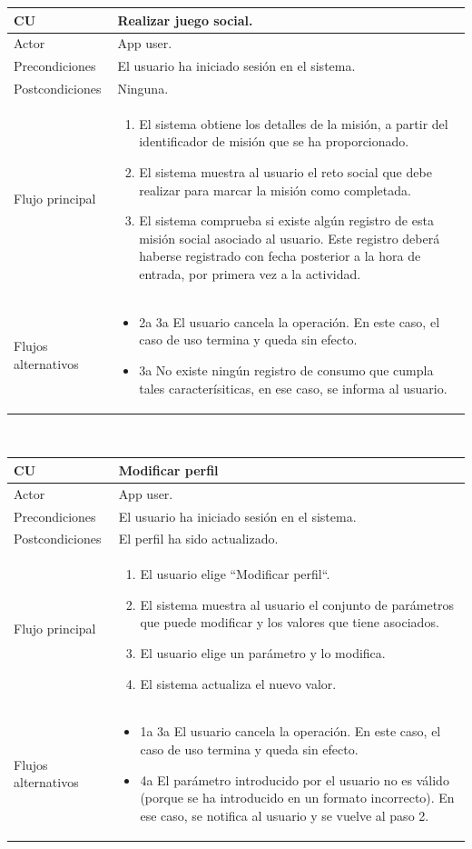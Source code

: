\documentclass[twoside]{report}
\newcommand\addrow[2]{#1 &#2\\ }
\newcommand\addheading[2]{#1 &#2\\ \hline}
\newcommand\tabularhead{\begin{tabular}{lp{0.7\textwidth}}
\hline
}
\newenvironment{usecase}{\tabularhead}
{\hline\end{tabular}}
\begin{document}
\begin{usecase}
  \addheading{\textbf{CU\arabic{usecase}}}{Realizar juego social.} 
  \addrow{Actor}{App user.}
  \addrow{Precondiciones}{El usuario ha iniciado sesión en el sistema.}
  \addrow{Postcondiciones}{Ninguna.}
  \addrow{Flujo principal}{
  		\begin{enumerate}
  		\item El sistema obtiene los detalles de la misión, a partir del identificador de misión que se ha proporcionado. %
  		\item El sistema muestra al usuario el reto social que debe realizar para marcar la misión como completada. %
  		\item El sistema comprueba si existe algún registro de esta misión social asociado al usuario. Este registro deberá haberse registrado con fecha posterior a la hora de entrada, por primera vez a la actividad. %
  		\end{enumerate}
  }
  \addrow{Flujos alternativos}{
  		\begin{itemize}
  		\item 2a 3a El usuario cancela la operación. En este caso, el caso de uso termina y queda sin efecto.
  		\item 3a No existe ningún registro de consumo que cumpla tales caracterísiticas, en ese caso, se informa al usuario.
  		\end{itemize}
  }
\end{usecase}\\

\vspace{0.5cm}


\begin{usecase}
  \addheading{\textbf{CU\arabic{usecase}}}{Modificar perfil} 
  \addrow{Actor}{App user.}
  \addrow{Precondiciones}{El usuario ha iniciado sesión en el sistema.}
  \addrow{Postcondiciones}{El perfil ha sido actualizado.}
  \addrow{Flujo principal}{
  		\begin{enumerate}
  		\item El usuario elige “Modificar perfil“. %
  		\item El sistema muestra al usuario el conjunto de parámetros que puede modificar y los valores que tiene asociados. %
  		\item El usuario elige un parámetro y lo modifica. %
  		\item El sistema actualiza el nuevo valor. %
  		\end{enumerate}
  }
  \addrow{Flujos alternativos}{
  		\begin{itemize}
  		\item 1a 3a El usuario cancela la operación. En este caso, el caso de uso termina y queda sin efecto.
  		\item 4a El parámetro introducido por el usuario no es válido (porque se ha introducido en un formato incorrecto). En ese caso, se notifica al usuario y se vuelve al paso 2.
  		\end{itemize}
  		}
\end{usecase}\\
\end{document}
